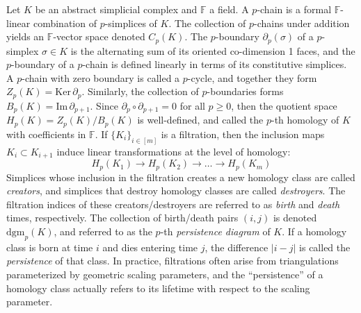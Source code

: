 \documentclass[sn-mathphys]{sn-jnl}
\begin{document}
Let $K$ be an abstract simplicial complex and $\mathbb{F}$ a field.
A $p$-chain is a
formal $\mathbb{F}$-linear combination  of $p$-simplices of $K$. The collection of $p$-chains under addition yields an 
$\mathbb{F}$-vector space  denoted   $C_p(K)$. 
The $p$-boundary $\partial_p(\sigma)$  of a $p$-simplex $\sigma\in K$ is the alternating sum of its oriented co-dimension 1 faces,
and the $p$-boundary of a $p$-chain is defined 
linearly in terms of its constitutive simplices. 
A $p$-chain with zero boundary is called a $p$-cycle, and together they form $Z_p(K) = \mathrm{Ker}\,\partial_p$. 
Similarly, the collection of $p$-boundaries forms  $B_p(K) = \mathrm{Im}\,\partial_{p+1}$.
Since $\partial_p \circ \partial_{p+1} = 0$ for all $p\geq 0$, 
then the quotient space $H_p(K) = Z_p(K) / B_{p}(K)$ is well-defined, and called the 
$p$-th homology of $K$ with coefficients in $\mathbb{F}$. 
If $\{K_i\}_{i\in [m]}$ is a filtration, then the inclusion maps  $K_i\subset K_{i+1}$   induce linear transformations 
at the level of homology:
\begin{equation}
	H_p(K_1) \to H_p(K_2) \to \dots \to H_p(K_m)
\end{equation}
Simplices whose inclusion in the filtration creates a new homology class are   called \emph{creators}, and simplices that destroy homology classes are   called \emph{destroyers}. 
The filtration indices of 
these creators/destroyers are referred to as \emph{birth} and \emph{death} times, respectively. 
The collection of birth/death  pairs 
$(i,j)$ is denoted $\mathrm{dgm}_p(K)$, 
and referred to as the $p$-th \emph{persistence diagram} of $K$.
If a homology class is born at time $i$ and dies entering time $j$, the difference $\lvert i - j \rvert$ is called the \emph{persistence} of that class.
In practice, filtrations often arise from triangulations parameterized by geometric scaling parameters, and the ``persistence'' of a homology class actually refers to its lifetime with respect to the scaling parameter. 
\end{document}
